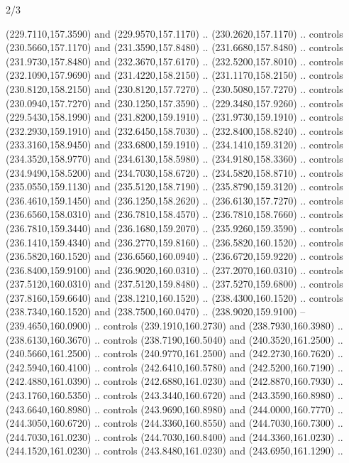 \begin{flagdescription}{2/3}
\begin{scope}[xshift=0.5\flaglength,yshift=0.5\flagwidth,scale=\flagwidth/259.2]
\begin{scope}[y=0.8pt, x=0.8pt, yscale=-1,shift={(-243,-162)}]
      (229.7110,157.3590) and (229.9570,157.1170) .. (230.2620,157.1170) .. controls
      (230.5660,157.1170) and (231.3590,157.8480) .. (231.6680,157.8480) .. controls
      (231.9730,157.8480) and (232.3670,157.6170) .. (232.5200,157.8010) .. controls
      (232.1090,157.9690) and (231.4220,158.2150) .. (231.1170,158.2150) .. controls
      (230.8120,158.2150) and (230.8120,157.7270) .. (230.5080,157.7270) .. controls
      (230.0940,157.7270) and (230.1250,157.3590) .. (229.3480,157.9260) .. controls
      (229.5430,158.1990) and (231.8200,159.1910) .. (231.9730,159.1910) .. controls
      (232.2930,159.1910) and (232.6450,158.7030) .. (232.8400,158.8240) .. controls
      (233.3160,158.9450) and (233.6800,159.1910) .. (234.1410,159.3120) .. controls
      (234.3520,158.9770) and (234.6130,158.5980) .. (234.9180,158.3360) .. controls
      (234.9490,158.5200) and (234.7030,158.6720) .. (234.5820,158.8710) .. controls
      (235.0550,159.1130) and (235.5120,158.7190) .. (235.8790,159.3120) .. controls
      (236.4610,159.1450) and (236.1250,158.2620) .. (236.6130,157.7270) .. controls
      (236.6560,158.0310) and (236.7810,158.4570) .. (236.7810,158.7660) .. controls
      (236.7810,159.3440) and (236.1680,159.2070) .. (235.9260,159.3590) .. controls
      (236.1410,159.4340) and (236.2770,159.8160) .. (236.5820,160.1520) .. controls
      (236.5820,160.1520) and (236.6560,160.0940) .. (236.6720,159.9220) .. controls
      (236.8400,159.9100) and (236.9020,160.0310) .. (237.2070,160.0310) .. controls
      (237.5120,160.0310) and (237.5120,159.8480) .. (237.5270,159.6800) .. controls
      (237.8160,159.6640) and (238.1210,160.1520) .. (238.4300,160.1520) .. controls
      (238.7340,160.1520) and (238.7500,160.0470) .. (238.9020,159.9100) --
      (239.4650,160.0900) .. controls (239.1910,160.2730) and (238.7930,160.3980) ..
      (238.6130,160.3670) .. controls (238.7190,160.5040) and (240.3520,161.2500) ..
      (240.5660,161.2500) .. controls (240.9770,161.2500) and (242.2730,160.7620) ..
      (242.5940,160.4100) .. controls (242.6410,160.5780) and (242.5200,160.7190) ..
      (242.4880,161.0390) .. controls (242.6880,161.0230) and (242.8870,160.7930) ..
      (243.1760,160.5350) .. controls (243.3440,160.6720) and (243.3590,160.8980) ..
      (243.6640,160.8980) .. controls (243.9690,160.8980) and (244.0000,160.7770) ..
      (244.3050,160.6720) .. controls (244.3360,160.8550) and (244.7030,160.7300) ..
      (244.7030,161.0230) .. controls (244.7030,160.8400) and (244.3360,161.0230) ..
      (244.1520,161.0230) .. controls (243.8480,161.0230) and (243.6950,161.1290) ..

\end{scope}
\end{scope}
\end{flagdescription}
